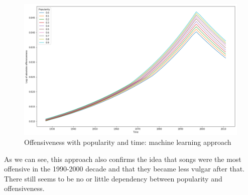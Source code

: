 \documentclass[11pt]{article}
\begin{document}
\begin{figure}
\centering
\includegraphics[width=\textwidth]{plots/ml_off_time_pop}
\caption{Offensiveness with popularity and time: machine learning approach}
\label{ml_off_time_pop}
\end{figure}

As we can see, this approach also confirms the idea that songs were the most offensive in the 1990-2000 decade and that they became less vulgar after that. There still seems to be no or little dependency between popularity and offensiveness.
\end{document}
